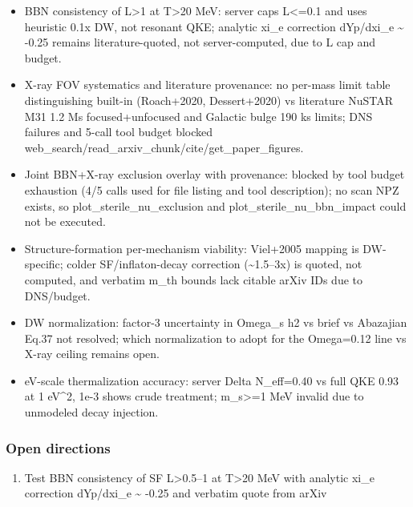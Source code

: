 \documentclass[11pt,a4paper]{article}
\begin{document}
\begin{itemize}
  \item BBN consistency of L\textgreater{}1 at T\textgreater{}20 MeV: server caps L\textless{}=0.1 and uses heuristic 0.1x DW, not resonant QKE; analytic xi\_e correction dYp/dxi\_e \textasciitilde{} -0.25 remains literature-quoted, not server-computed, due to L cap and budget.
  \item X-ray FOV systematics and literature provenance: no per-mass limit table distinguishing built-in (Roach+2020, Dessert+2020) vs literature NuSTAR M31 1.2 Ms focused+unfocused and Galactic bulge 190 ks limits; DNS failures and 5-call tool budget blocked web\_search/read\_arxiv\_chunk/cite/get\_paper\_figures.
  \item Joint BBN+X-ray exclusion overlay with provenance: blocked by tool budget exhaustion (4/5 calls used for file listing and tool description); no scan NPZ exists, so plot\_sterile\_nu\_exclusion and plot\_sterile\_nu\_bbn\_impact could not be executed.
  \item Structure-formation per-mechanism viability: Viel+2005 mapping is DW-specific; colder SF/inflaton-decay correction (\textasciitilde{}1.5--3x) is quoted, not computed, and verbatim m\_th bounds lack citable arXiv IDs due to DNS/budget.
  \item DW normalization: factor-3 uncertainty in Omega\_s h2 vs brief vs Abazajian Eq.37 not resolved; which normalization to adopt for the Omega=0.12 line vs X-ray ceiling remains open.
  \item eV-scale thermalization accuracy: server Delta N\_eff=0.40 vs full QKE 0.93 at 1 eV\textasciicircum{}2, 1e-3 shows crude treatment; m\_s\textgreater{}=1 MeV invalid due to unmodeled decay injection.
\end{itemize}
\subsubsection*{Open directions}
\begin{enumerate}
  \item Test BBN consistency of SF L\textgreater{}0.5--1 at T\textgreater{}20 MeV with analytic xi\_e correction dYp/dxi\_e \textasciitilde{} -0.25 and verbatim quote from arXiv
\end{enumerate}
\end{document}

